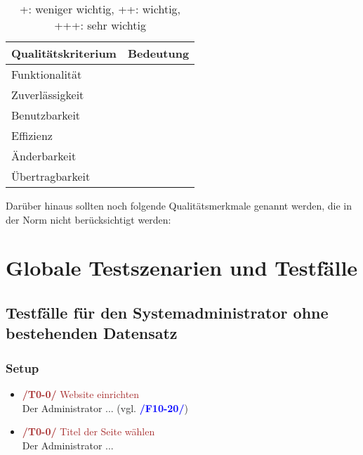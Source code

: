\documentclass[a4paper]{scrreprt}
\newcounter{Lc}
\newcounter{Hc}
\newcommand{\resetAllCounter}{\setcounter{Lc}{0}\setcounter{Hc}{1}}
\begin{document}
\begin{table}[h]
 
    \begin{center}
    \begin{tabular}{|l|c|}
    \hline 
    \rule[-1ex]{0pt}{2.5ex} \textbf{Qualitätskriterium} & \textbf{Bedeutung} \\ 
    \hline 
    \rule[-1ex]{0pt}{2.5ex} Funktionalität &  \\ 
    \hline 
    \rule[-1ex]{0pt}{2.5ex} Zuverlässigkeit &  \\ 
    \hline 
    \rule[-1ex]{0pt}{2.5ex} Benutzbarkeit &  \\ 
    \hline 
    \rule[-1ex]{0pt}{2.5ex} Effizienz &  \\ 
    \hline 
    \rule[-1ex]{0pt}{2.5ex} Änderbarkeit &  \\ 
    \hline 
    \rule[-1ex]{0pt}{2.5ex} Übertragbarkeit &  \\ 
    \hline   
    \end{tabular}  
    \end{center}
    \caption{+: weniger wichtig, ++: wichtig, +++: sehr wichtig} 
    \label{qTabelle}   
\end{table}
    
Darüber hinaus sollten noch folgende Qualitätsmerkmale genannt werden, die in der Norm nicht berücksichtigt werden:
 
\resetAllCounter
\newcommand{\Test}[1]{\stepcounter{Lc}\textcolor{Brown}{\textbf{/T\arabic{Hc}0-\arabic{Lc}0/} #1} \\}
\newcommand{\RefFuncBlue}[1]{\textcolor{Blue}{\textbf{#1}}}
\newcommand{\RefFuncGreen}[1]{\textcolor{Green}{\textbf{#1}}}
\chapter{Globale Testszenarien und Testfälle}
 

	\section{Testfälle für den Systemadministrator ohne bestehenden Datensatz}
		\subsection{Setup}
			\begin{itemize}
				\item \Test{Website einrichten} 
				Der Administrator ... (vgl. \RefFuncBlue{/F10-20/})		
				\item \Test{Titel der Seite wählen} 
				Der Administrator ... 		
			\end{itemize}			
\end{document}
